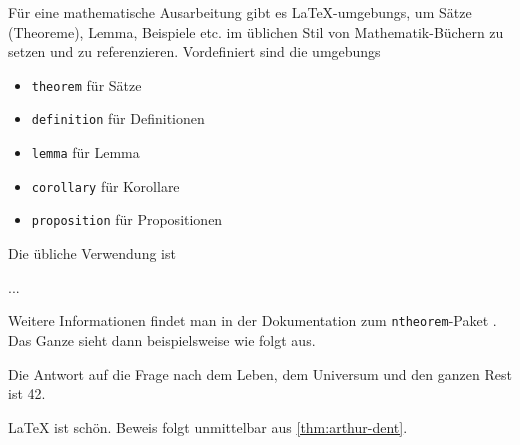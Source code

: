 Für eine mathematische Ausarbeitung gibt es LaTeX-\glspl{umgebung}, um
Sätze (Theoreme), Lemma,
Beispiele etc. im üblichen Stil von
Mathematik-Büchern zu setzen und zu referenzieren. Vordefiniert sind die
\glspl{umgebung}
\begin{itemize}
  \item \texttt{theorem} für Sätze
  \item \texttt{definition} für Definitionen
  \item \texttt{lemma} für Lemma
  \item \texttt{corollary} für Korollare
  \item \texttt{proposition} für Propositionen
\end{itemize}
Die übliche Verwendung ist
\begin{latex}[caption={Beispiel für Theorem-Umgebungen},label={lst:ntheorem}]
\begin{theorem}\label{thm:my-thoerem}
...
\end{theorem}
\end{latex}
Weitere Informationen findet man in der Dokumentation zum \texttt{ntheorem}-Paket
\parencite{May2011}. Das Ganze sieht dann beispielsweise wie folgt aus.

\begin{theorem}\label{thm:arthur-dent} Die Antwort auf
die Frage nach dem Leben, dem Universum und den ganzen Rest ist 42.
\end{theorem}

\begin{proposition} LaTeX ist schön. Beweis folgt
unmittelbar aus \cref{thm:arthur-dent}.
\end{proposition}

